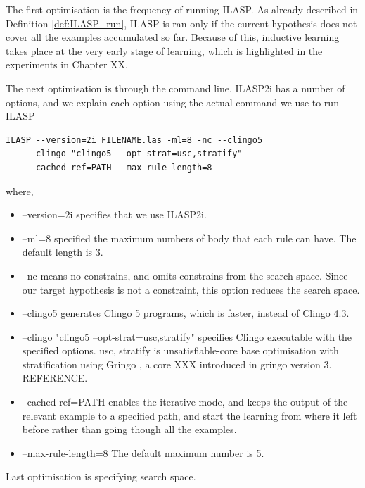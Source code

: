 The first optimisation is the frequency of running ILASP. 
As already described in Definition \ref{def:ILASP_run}, ILASP is ran only if the current hypothesis does not cover all the examples accumulated so far.
Because of this, inductive learning takes place at the very early stage of learning, which is highlighted in the experiments in Chapter XX. 

The next optimisation is through the command line. 
ILASP2i has a number of options, and we explain each option using the actual command we use to run ILASP


\begin{lstlisting}[]
    ILASP --version=2i FILENAME.las -ml=8 -nc --clingo5 
    --clingo "clingo5 --opt-strat=usc,stratify" 
    --cached-ref=PATH --max-rule-length=8
\end{lstlisting}

where,
\begin{itemize}
\item \textsf{--version=2i} specifies that we use ILASP2i.
\item \textsf{--ml=8} specified the maximum numbers of body that each rule can have. The default length is 3.
\item \textsf{--nc} means no constrains, and omits constrains from the search space. Since our target hypothesis is not a constraint, this option reduces the search space.
\item \textsf{--clingo5} generates Clingo 5 programs, which is faster, instead of Clingo 4.3.
\item \textsf{--clingo "clingo5 --opt-strat=usc,stratify"} specifies Clingo executable with the specified options. 
\textsf{usc, stratify} is unsatisfiable-core base optimisation with stratification using Gringo \cite{gringo}, a core XXX introduced in gringo version 3. REFERENCE.
\item \textsf{--cached-ref=PATH} enables the iterative mode, and keeps the output of the relevant example to a specified path, and start the learning from where it left before rather than going though all the examples.
\item \textsf{--max-rule-length=8} The default maximum number is 5.
\end{itemize}

Last optimisation is specifying search space.

